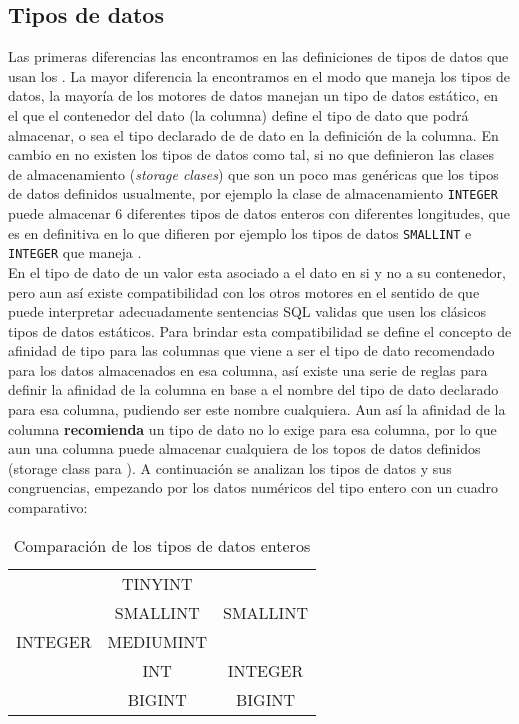 \subsection{Tipos de datos}
Las primeras diferencias las encontramos en las definiciones de tipos de datos que usan los \dd. La mayor diferencia la encontramos en el modo que \s maneja los tipos de datos, la mayoría de los motores de datos manejan un tipo de datos estático, en el que el contenedor del dato (la columna) define el tipo de dato que podrá almacenar, o sea el tipo declarado de de dato en la definición de la columna. En cambio en \s no existen los tipos de datos como tal, si no que definieron las clases de almacenamiento (\textit{storage clases}) que son un poco mas genéricas que los tipos de datos definidos usualmente, por ejemplo la clase de almacenamiento \verb=INTEGER= puede almacenar 6 diferentes tipos de datos enteros con diferentes longitudes, que es en definitiva en lo que difieren por ejemplo los tipos de datos \verb=SMALLINT= e \verb=INTEGER= que maneja \m.\\

 En \s el tipo de dato de un valor esta asociado a el dato en si y no a su contenedor, pero aun así existe compatibilidad con los otros motores en el sentido de que \s puede interpretar adecuadamente sentencias SQL validas que usen los clásicos tipos de datos estáticos. Para brindar esta compatibilidad se define el concepto de afinidad de tipo para las columnas que viene a ser el tipo de dato recomendado para los datos almacenados en esa columna, así existe una serie de reglas para definir la afinidad de la columna en base a el nombre del tipo de dato declarado para esa columna, pudiendo ser este nombre cualquiera. Aun así la afinidad de la columna \textbf{recomienda} un tipo de dato no lo exige para esa columna, por lo que aun una columna puede almacenar cualquiera de los topos de datos definidos (storage class para \s). A continuación se analizan los tipos de datos y sus congruencias, empezando por los datos numéricos del tipo entero con un cuadro comparativo:       
\begin{table}
\begin{center}
\begin{tabular}{|c|c|c|}
\hline \s & \m & \p \\ 
\hline  & TINYINT &  \\ 
  & SMALLINT & SMALLINT \\ 
 INTEGER & MEDIUMINT &  \\
  & INT & INTEGER \\
  & BIGINT & BIGINT \\  
\hline 
\end{tabular} 
\end{center}
\caption{Comparación de los tipos de datos enteros}
\end{table}

